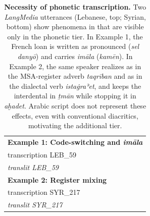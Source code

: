 \begin{table}[t]
\centering
\begin{tabular}{p{}}
\toprule
\textbf{Example 1: Code-switching and \textit{imāla}}\\
{{transcription LEB_59}}
\\
\textit{{{translit LEB_59}}}
\\
\midrule
\textbf{Example 2: Register mixing}\\
{{transcription SYR_217}}
\\
\textit{{{translit SYR_217}}}
\\
\bottomrule
\end{tabular}
\caption{
\textbf{Necessity of phonetic transcription.}
Two \textit{LangMedia} utterances (Lebanese, top; Syrian, bottom) show phenomena in \ourbenchmark{} that are visible only in the phonetic tier. In Example 1, the French loan is written as pronounced (\textit{sel danyō}) and  carries \textit{imāla} (\textit{kamēn}). In Example 2, the same speaker realizes  as  in the MSA-register adverb \textit{taqrīban} and as  in the dialectal verb \textit{istaġraʾet}, and keeps the interdental in \textit{ṯmān} while stopping it in \textit{aḫadet}. Arabic script does not represent these effects, even with conventional diacritics, motivating the additional tier.
}
\label{tab:multiglossia}
\end{table}
